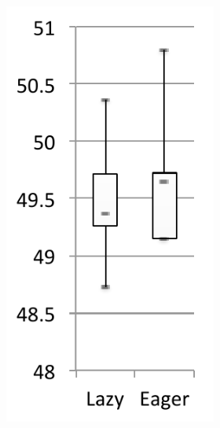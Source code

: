 \documentclass[sigplan,10pt,screen]{acmart}\settopmatter{printfolios=true,printccs=true,printacmref=true}
\begin{document}
\begin{figure}[bth]
	\centering
	\begin{subfigure}[b]{.48\textwidth}
    	\hspace{.03\textwidth}\begin{subfigure}[b]{.28\textwidth}
		\includegraphics[width=\linewidth]{figures/netBeansLoadExecTime} 

\end{subfigure}
\end{subfigure}
\end{figure}
\end{document}
